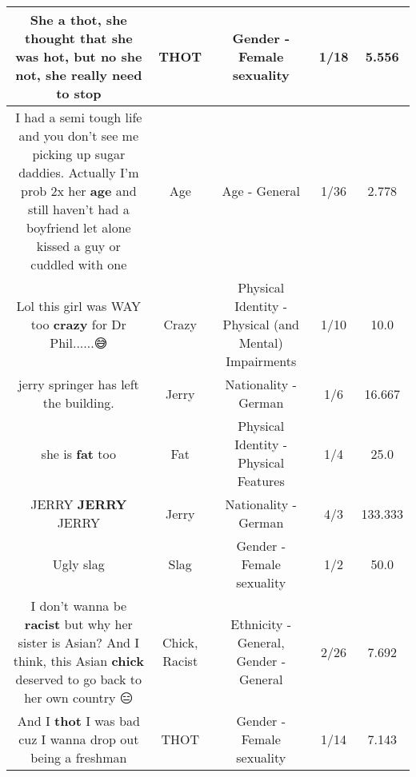\documentclass[11pt]{article}
\newlength\mylength
\begin{document}
\begin{center}
\begin{longtable}{|C{.65\mylength}|C{.30\mylength}|C{.12\mylength}|C{.12\mylength}|C{.12\mylength}|}
  \small She a \textbf{thot}, she thought that she was hot, but no she not, she really need to stop\normalsize   & THOT & Gender - Female sexuality & 1/18 & 5.556 \\  \hline
  \small I had a semi tough life and you don't see me picking up sugar daddies. Actually I'm prob 2x her \textbf{age} and still haven't had a boyfriend let alone kissed a guy or cuddled with one\normalsize   & Age & Age - General & 1/36 & 2.778 \\  \hline
  \small Lol this girl was WAY too \textbf{crazy} for Dr Phil......😅\normalsize   & Crazy & Physical Identity - Physical (and Mental) Impairments & 1/10 & 10.0 \\  \hline
  \small jerry springer has left the building.\normalsize   & Jerry & Nationality - German & 1/6 & 16.667 \\  \hline
  \small she is \textbf{fat} too\normalsize   & Fat & Physical Identity - Physical Features & 1/4 & 25.0 \\  \hline
  \small JERRY \textbf{JERRY} JERRY\normalsize   & Jerry & Nationality - German & 4/3 & 133.333 \\  \hline
  \small Ugly slag\normalsize   & Slag & Gender - Female sexuality & 1/2 & 50.0 \\  \hline
  \small I don't wanna be \textbf{racist} but why her sister is Asian? And I think, this Asian \textbf{chick} deserved to go back to her own country 😑\normalsize   & Chick, Racist & Ethnicity - General, Gender - General & 2/26 & 7.692 \\  \hline
  \small And I \textbf{thot} I was bad cuz I wanna drop out being a freshman\normalsize   & THOT & Gender - Female sexuality & 1/14 & 7.143 \\  \hline

\end{longtable}
\end{center}
\end{document}
